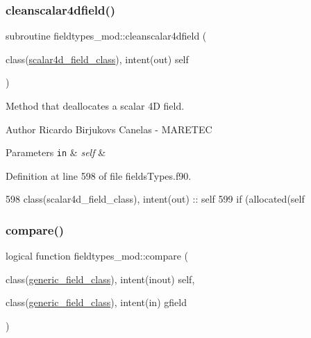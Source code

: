 \subsubsection{\texorpdfstring{cleanscalar4dfield()}{cleanscalar4dfield()}}
{\footnotesize\ttfamily subroutine fieldtypes\+\_\+mod\+::cleanscalar4dfield (\begin{DoxyParamCaption}\item[{class(\mbox{\hyperlink{structfieldtypes__mod_1_1scalar4d__field__class}{scalar4d\+\_\+field\+\_\+class}}), intent(out)}]{self }\end{DoxyParamCaption})\hspace{0.3cm}{\ttfamily [private]}}



Method that deallocates a scalar 4D field. 

\begin{DoxyAuthor}{Author}
Ricardo Birjukovs Canelas -\/ M\+A\+R\+E\+T\+EC 
\end{DoxyAuthor}

\begin{DoxyParams}[1]{Parameters}
\mbox{\tt in}  & {\em self} & \\
\hline
\end{DoxyParams}


Definition at line 598 of file fields\+Types.\+f90.


\begin{DoxyCode}
598     \textcolor{keywordtype}{class}(scalar4d\_field\_class), \textcolor{keywordtype}{intent(out)} :: self
599     \textcolor{keywordflow}{if} (\textcolor{keyword}{allocated}(self%
\end{DoxyCode}
\mbox{\label{namespacefieldtypes__mod_aad356f6f10d8edc58c56f02c796423f3}} 
\subsubsection{\texorpdfstring{compare()}{compare()}}
{\footnotesize\ttfamily logical function fieldtypes\+\_\+mod\+::compare (\begin{DoxyParamCaption}\item[{class(\mbox{\hyperlink{structfieldtypes__mod_1_1generic__field__class}{generic\+\_\+field\+\_\+class}}), intent(inout)}]{self,  }\item[{class(\mbox{\hyperlink{structfieldtypes__mod_1_1generic__field__class}{generic\+\_\+field\+\_\+class}}), intent(in)}]{gfield }\end{DoxyParamCaption})\hspace{0.3cm}{\ttfamily [private]}}



